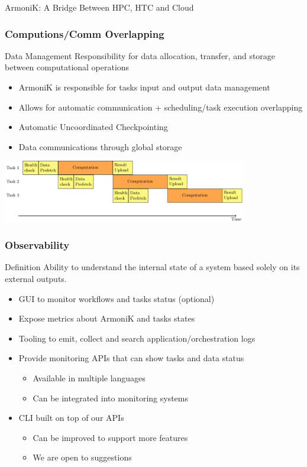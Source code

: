 \documentclass[10pt,aspectratio=1609]{beamer}
\begin{document}
\begin{section}{ArmoniK: A Bridge Between HPC, HTC and Cloud}
  \begin{frame}
    \frametitle{Computions/Comm Overlapping}
    \begin{block}{Data Management}
      Responsibility for data allocation, transfer, and storage between computational operations
    \end{block}
    \begin{itemize}
      \item ArmoniK is responsible for tasks input and output data management
      \item Allows for automatic communication + scheduling/task execution overlapping
      \item Automatic Uncoordinated Checkpointing
      \item Data communications through global storage
    \end{itemize}
    \vspace{3ex}
    \includegraphics[width=0.8\textwidth]{armonik_pipelining.pdf}
  \end{frame}

  \begin{frame}
    \frametitle{Observability}
    \begin{block}{Definition}
      Ability to understand the internal state of a system based solely on its external outputs.
    \end{block}
    \begin{itemize}
      \item GUI to monitor workflows and tasks status (optional)
      \item Expose metrics about ArmoniK and tasks states
      \item Tooling to emit, collect and search application/orchestration logs
      \item Provide monitoring APIs that can show tasks and data status
      \begin{itemize}
        \item Available in multiple languages
        \item Can be integrated into monitoring systems
      \end{itemize}
      \item CLI built on top of our APIs
      \begin{itemize}
        \item Can be improved to support more features
        \item We are open to suggestions
      \end{itemize}
    \end{itemize}
  \end{frame}


\end{section}
\end{document}
